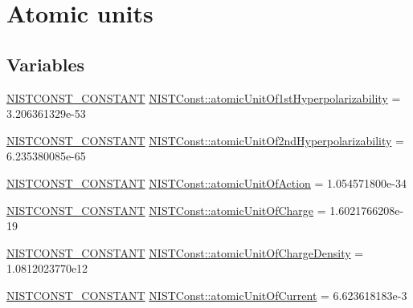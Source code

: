 \hypertarget{group___n_i_s_t_const-_atomic_unit}{}\section{Atomic units}
\label{group___n_i_s_t_const-_atomic_unit}
\subsection*{Variables}
\begin{DoxyCompactItemize}
\item 
\mbox{\hyperlink{_n_i_s_t_const_8hpp_a2b0fc1d7452373f816175dd86ce26729}{N\+I\+S\+T\+C\+O\+N\+S\+T\+\_\+\+C\+O\+N\+S\+T\+A\+NT}} \mbox{\hyperlink{group___n_i_s_t_const-_atomic_unit_gaa8a2a7516740737167afdeb3cd4ee584}{N\+I\+S\+T\+Const\+::atomic\+Unit\+Of1st\+Hyperpolarizability}} = 3.\+206361329e-\/53
\item 
\mbox{\hyperlink{_n_i_s_t_const_8hpp_a2b0fc1d7452373f816175dd86ce26729}{N\+I\+S\+T\+C\+O\+N\+S\+T\+\_\+\+C\+O\+N\+S\+T\+A\+NT}} \mbox{\hyperlink{group___n_i_s_t_const-_atomic_unit_gabcc03469254baef16a69abd058ae5ada}{N\+I\+S\+T\+Const\+::atomic\+Unit\+Of2nd\+Hyperpolarizability}} = 6.\+235380085e-\/65
\item 
\mbox{\hyperlink{_n_i_s_t_const_8hpp_a2b0fc1d7452373f816175dd86ce26729}{N\+I\+S\+T\+C\+O\+N\+S\+T\+\_\+\+C\+O\+N\+S\+T\+A\+NT}} \mbox{\hyperlink{group___n_i_s_t_const-_atomic_unit_ga7f1326edcbb03c0df4c2e81afcea7ac8}{N\+I\+S\+T\+Const\+::atomic\+Unit\+Of\+Action}} = 1.\+054571800e-\/34
\item 
\mbox{\hyperlink{_n_i_s_t_const_8hpp_a2b0fc1d7452373f816175dd86ce26729}{N\+I\+S\+T\+C\+O\+N\+S\+T\+\_\+\+C\+O\+N\+S\+T\+A\+NT}} \mbox{\hyperlink{group___n_i_s_t_const-_atomic_unit_gaa850ac93fa2ec31582147af4bcafd984}{N\+I\+S\+T\+Const\+::atomic\+Unit\+Of\+Charge}} = 1.\+6021766208e-\/19
\item 
\mbox{\hyperlink{_n_i_s_t_const_8hpp_a2b0fc1d7452373f816175dd86ce26729}{N\+I\+S\+T\+C\+O\+N\+S\+T\+\_\+\+C\+O\+N\+S\+T\+A\+NT}} \mbox{\hyperlink{group___n_i_s_t_const-_atomic_unit_gaaeb55a2b43e7885495495e2a613eb481}{N\+I\+S\+T\+Const\+::atomic\+Unit\+Of\+Charge\+Density}} = 1.\+0812023770e12
\item 
\mbox{\hyperlink{_n_i_s_t_const_8hpp_a2b0fc1d7452373f816175dd86ce26729}{N\+I\+S\+T\+C\+O\+N\+S\+T\+\_\+\+C\+O\+N\+S\+T\+A\+NT}} \mbox{\hyperlink{group___n_i_s_t_const-_atomic_unit_ga664164b535c0f978a02afff805d58a34}{N\+I\+S\+T\+Const\+::atomic\+Unit\+Of\+Current}} = 6.\+623618183e-\/3

\end{DoxyCompactItemize}
